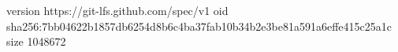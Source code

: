 version https://git-lfs.github.com/spec/v1
oid sha256:7bb04622b1857db6254d8b6c4ba37fab10b34b2e3be81a591a6effe415c25a1c
size 1048672
